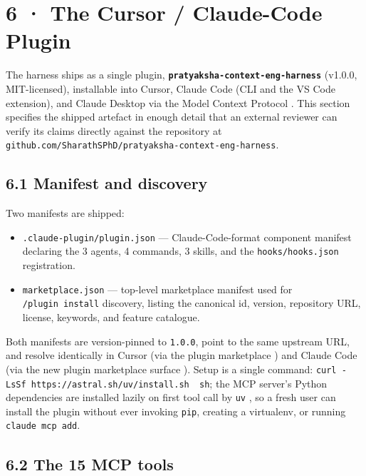 \section{6 · The Cursor / Claude-Code Plugin}\label{the-cursor-claude-code-plugin}

The harness ships as a single plugin, \textbf{\texttt{pratyaksha-context-eng-harness}} (v1.0.0, MIT-licensed), installable into Cursor, Claude Code (CLI and the VS Code extension), and Claude Desktop via the Model Context Protocol \citep{anthropic2025mcp}. This section specifies the shipped artefact in enough detail that an external reviewer can verify its claims directly against the repository at \texttt{github.com/SharathSPhD/pratyaksha-context-eng-harness}.

\subsection{6.1 Manifest and discovery}\label{manifest-and-discovery}

Two manifests are shipped:

\begin{itemize}
\tightlist
\item
  \texttt{.claude-plugin/plugin.json} --- Claude-Code-format component manifest declaring the 3 agents, 4 commands, 3 skills, and the \texttt{hooks/hooks.json} registration.
\item
  \texttt{marketplace.json} --- top-level marketplace manifest used for \texttt{/plugin\ install} discovery, listing the canonical id, version, repository URL, license, keywords, and feature catalogue.
\end{itemize}

Both manifests are version-pinned to \texttt{1.0.0}, point to the same upstream URL, and resolve identically in Cursor (via the plugin marketplace \citep{cursor2025plugins}) and Claude Code (via the new plugin marketplace surface \citep{anthropic2025claudecode}). Setup is a single command: \texttt{curl\ -LsSf\ https://astral.sh/uv/install.sh\ \textbar{}\ sh}; the MCP server's Python dependencies are installed lazily on first tool call by \texttt{uv} \citep{uv2025}, so a fresh user can install the plugin without ever invoking \texttt{pip}, creating a virtualenv, or running \texttt{claude\ mcp\ add}.

\subsection{6.2 The 15 MCP tools}\label{the-15-mcp-tools}

